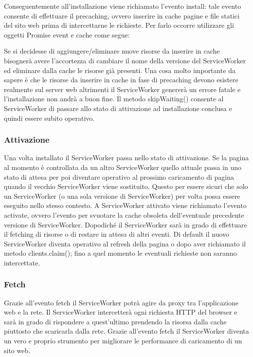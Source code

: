 \documentclass[11pt ,a4paper , twoside , openright ]{article}
\begin{document}
Conseguentemente all’installazione viene richiamato l’evento install: tale evento consente di effettuare il precaching, ovvero inserire in cache pagine e file statici del sito web prima di intercettarne le richieste. Per farlo occorre utilizzare gli oggetti Promise event e cache come segue:

Se si decidesse di aggiungere/eliminare nuove risorse da inserire in cache bisognerà avere l’accortezza di cambiare il nome della versione del ServiceWorker ed eliminare dalla cache le risorse già presenti.
Una cosa molto importante da sapere è che le risorse da inserire in cache in fase di precaching devono esistere realmente sul server web altrimenti il ServiceWorker genererà un errore fatale e l’installazione non andrà a buon fine. 
Il metodo skipWaiting() consente al ServiceWorker di passare allo stato di attivazione ad installazione conclusa e quindi essere subito operativo.

\subsubsection{Attivazione}
Una volta installato il ServiceWorker passa nello stato di attivazione. Se la pagina al momento è controllata da un altro ServiceWorker quello attuale passa in uno stato di attesa per poi diventare operativo al prossimo caricamento di pagina quando il vecchio ServiceWorker viene sostituito.
Questo per essere sicuri che solo un ServiceWorker (o una sola versione di ServiceWorker) per volta possa essere eseguito nello stesso contesto.
A ServiceWorker attivato viene richiamato l’evento activate, ovvero l'evento per svuotare la cache obsoleta dell’eventuale precedente versione di ServiceWorker. Dopodiché il ServiceWorker sarà in grado di effettuare il fetching di risorse o di restare in attesa di altri eventi.
Di default il nuovo ServiceWorker diventa operativo al refresh della pagina o dopo aver richiamato il metodo clients.claim(); fino a quel momento le eventuali richieste non saranno intercettate. 

\subsubsection{Fetch}
Grazie all’evento fetch il ServiceWorker potrà agire da proxy tra l’applicazione web e la rete.
Il ServiceWorker intercetterà ogni richiesta HTTP del browser e sarà in grado di rispondere a quest’ultimo prendendo la risorsa dalla cache piuttosto che scaricarla dalla rete.
Grazie all’evento fetch il ServiceWorker diventa un vero e proprio strumento per migliorare le performance di caricamento di un sito web.
\end{document}
